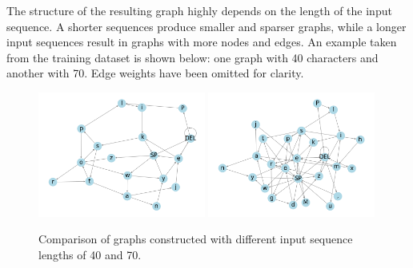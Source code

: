 The structure of the resulting graph highly depends on the length of the input sequence. A shorter sequences produce smaller and sparser graphs, while a longer input sequences result in graphs with more nodes and edges. An example taken from the training dataset is shown below: one graph with 40 characters and another with 70. Edge weights have been omitted for clarity.

\begin{figure}[H]
	\centering
	\includegraphics[width=0.49\textwidth]{images/len40_graph_other_layout.png}
	\includegraphics[width=0.49\textwidth]{images/better_70_char_graph.png}
	\caption{Comparison of graphs constructed with different input sequence lengths of 40 and 70.}%
	\label{fig:multiple graphs}%
\end{figure}


